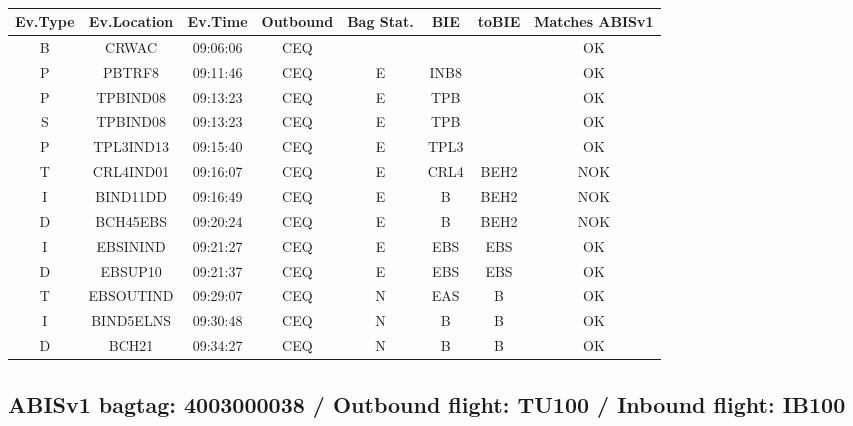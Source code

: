 \documentclass{report}
\begin{document}
\paragraph{}
\begin{longtable}{cccccccc}    \toprule
\rowcolor{white!50}
\textbf{Ev.Type} & \textbf{Ev.Location} & \textbf{Ev.Time} & \textbf{Outbound} & \textbf{Bag Stat.} & \textbf{BIE} & \textbf{toBIE} & \textbf{Matches ABISv1} \\\midrule
B & CRWAC & 09:06:06  & CEQ &  &  &  & OK\\
P & PBTRF8 & 09:11:46  & CEQ & E & INB8 &  & OK\\
P & TPBIND08 & 09:13:23  & CEQ & E & TPB &  & OK\\
S & TPBIND08 & 09:13:23  & CEQ & E & TPB &  & OK\\
P & TPL3IND13 & 09:15:40  & CEQ & E & TPL3 &  & OK\\
T & CRL4IND01 & 09:16:07  & CEQ & E & CRL4 & BEH2 & NOK\\
I & BIND11DD & 09:16:49  & CEQ & E & B & BEH2 & NOK\\
D & BCH45EBS & 09:20:24  & CEQ & E & B & BEH2 & NOK\\
I & EBSININD & 09:21:27  & CEQ & E & EBS & EBS & OK\\
D & EBSUP10 & 09:21:37  & CEQ & E & EBS & EBS & OK\\
T & EBSOUTIND & 09:29:07  & CEQ & N & EAS & B & OK\\
I & BIND5ELNS & 09:30:48  & CEQ & N & B & B & OK\\
D & BCH21 & 09:34:27  & CEQ & N & B & B & OK\\
\bottomrule
\end{longtable}
\subsection*{ABISv1 bagtag: 4003000038 / Outbound flight: TU100 / Inbound flight: IB100}
\end{document}
